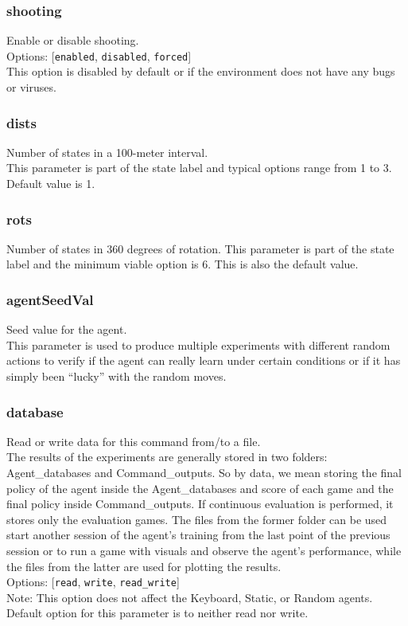 \subsubsection*{shooting}
\label{opt:shooting}
Enable or disable shooting.\\
Options: [\texttt{enabled}, \texttt{disabled}, \texttt{forced}]\\
This option is disabled by default or if the environment does not have any bugs or viruses.

\subsubsection*{dists}
\label{opt:dists}
Number of states in a 100-meter interval.\\
This parameter is part of the state label and typical options range from 1 to 3. Default value is 1.

\subsubsection*{rots}
\label{opt:rots}
Number of states in 360 degrees of rotation.
This parameter is part of the state label and the minimum viable option is 6. This is also the default value.

\subsubsection*{agentSeedVal}
\label{opt:agentSeedVal}
Seed value for the agent.\\
This parameter is used to produce multiple experiments with different random actions to verify if the agent can really learn under certain conditions or if it has simply been ``lucky'' with the random moves.

\subsubsection*{database}
\label{opt:database}
Read or write data for this command from/to a file.\\
The results of the experiments are generally stored in two folders:\\ Agent\_databases and Command\_outputs. 
So by data, we mean storing the final policy of the agent inside the Agent\_databases and score of each game and the final policy inside Command\_outputs. If continuous evaluation is performed, it stores only the evaluation games.
The files from the former folder can be used start another session of the agent's training from the last point of the previous session or to run a game with visuals and observe the agent's performance, while the files from the latter are used for plotting the results.\\
Options: [\texttt{read}, \texttt{write}, \texttt{read\_write}]\\
Note: This option does not affect the Keyboard, Static, or Random agents. Default option for this parameter is to neither read nor write.

